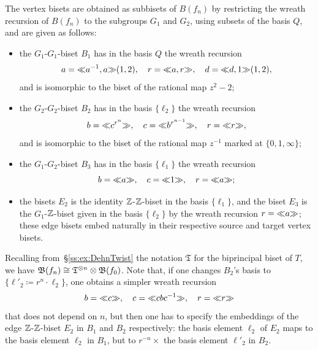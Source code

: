 \documentclass{amsart}
\begin{document}
The vertex bisets are obtained as subbisets of $B(f_n)$ by
restricting the wreath recursion of $B(f_n)$ to the subgroups $G_1$
and $G_2$, using subsets of the basis $Q$, and are given as follows:
\begin{itemize}
\item the $G_1$-$G_1$-biset $B_1$ has in the basis $Q$ the wreath
  recursion
  \[a={\ll}a^{-1},a{\gg}(1,2),\quad r={\ll}a,r{\gg},\quad d={\ll}d,1{\gg}(1,2),\]
  and is isomorphic to the biset of the rational map $z^2-2$;
\item the $G_2$-$G_2$-biset $B_2$ has in the basis $\{\ell_2\}$ the
  wreath recursion
  \[b={\ll}c^{r^n}{\gg},\quad c={\ll}b^{r^{n-1}}{\gg},\quad r={\ll}r{\gg},\] and
  is isomorphic to the biset of the rational map $z^{-1}$ marked at
  $\{0,1,\infty\}$;
\item the $G_1$-$G_2$-biset $B_3$ has in the basis $\{\ell_1\}$ the
  wreath recursion
  \[b={\ll}a{\gg},\quad c={\ll}1{\gg},\quad r={\ll}a{\gg};\]
\item the bisets $E_2$ is the identity ${\mathbb Z}$-${\mathbb Z}$-biset in the basis
  $\{\ell_1\}$, and the biset $E_3$ is the $G_1$-${\mathbb Z}$-biset given in the
  basis $\{\ell_2\}$ by the wreath recursion $r={\ll}a{\gg}$; these edge
  bisets embed naturally in their respective source and target vertex
  bisets.
\end{itemize}
Recalling from~\S\ref{ss:ex:DehnTwist} the notation $\mathfrak T$ for
the biprincipal biset of $T$, we have
${\mathfrak B}(f_n)\cong\mathfrak T^{\otimes n}\otimes{\mathfrak B}(f_0)$. Note that, if
one changes $B_2$'s basis to $\{\ell'_2\coloneqq r^n\cdot \ell_2\}$,
one obtains a simpler wreath recursion
\[b={\ll}c{\gg} ,\quad c={\ll}c b c^{-1}{\gg},\quad r={\ll}r{\gg}
\]
that does not depend on $n$, but then one has to specify the
embeddings of the edge ${\mathbb Z}$-${\mathbb Z}$-biset $E_2$ in $B_1$ and $B_2$
respectively: the basis element $ \ell_2$ of $E_2$ maps to the basis
element $\ell_2$ in $B_1$, but to $r^{-n}\times$ the basis element
$\ell'_2$ in $B_2$.
\end{document}

